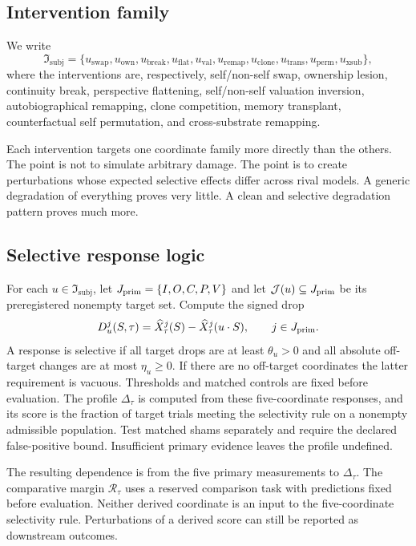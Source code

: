 \documentclass[11pt,a4paper]{article}
\theoremstyle{definition}
\newcommand{\IntervFam}{\mathfrak{I}_{\mathrm{subj}}}
\newcommand{\SelfIndex}{I}
\newcommand{\OwnField}{O}
\newcommand{\ContField}{C}
\newcommand{\Persp}{P}
\newcommand{\ValAsym}{V}
\newcommand{\IntervProf}{\Delta}
\newcommand{\Irred}{\mathcal{R}}
\begin{document}
\subsection{Intervention family}
We write
\[
\IntervFam=\{u_{\mathrm{swap}},u_{\mathrm{own}},u_{\mathrm{break}},u_{\mathrm{flat}},u_{\mathrm{val}},u_{\mathrm{remap}},u_{\mathrm{clone}},u_{\mathrm{trans}},u_{\mathrm{perm}},u_{\mathrm{xsub}}\},
\]
where the interventions are, respectively, self/non-self swap, ownership lesion, continuity break, perspective flattening, self/non-self valuation inversion, auto\-bio\-graphical remapping, clone competition, memory transplant, counterfactual self permutation, and cross-substrate remapping.

Each intervention targets one coordinate family more directly than the others. The point is not to simulate arbitrary damage. The point is to create perturbations whose expected selective effects differ across rival models. A generic degradation of everything proves very little. A clean and selective degradation pattern proves much more.

\subsection{Selective response logic}
For each $u\in\IntervFam$, let $J_{\rm prim}=\{\SelfIndex,\OwnField,\ContField,\Persp,\ValAsym\}$ and let $\mathcal J(u)\subseteq J_{\rm prim}$ be its preregistered nonempty target set. Compute the signed drop
\[
 D_u^j(S,\tau)=\widehat X_\tau^j(S)-\widehat X_\tau^j(u\cdot S),
 \qquad j\in J_{\rm prim}.
\]
A response is selective if all target drops are at least $\theta_u>0$ and all absolute off-target changes are at most $\eta_u\ge0$. If there are no off-target coordinates the latter requirement is vacuous. Thresholds and matched controls are fixed before evaluation. The profile $\IntervProf_\tau$ is computed from these five-coordinate responses, and its score is the fraction of target trials meeting the selectivity rule on a nonempty admissible population. Test matched shams separately and require the declared false-positive bound. Insufficient primary evidence leaves the profile undefined.

The resulting dependence is from the five primary measurements to $\IntervProf_\tau$. The comparative margin $\Irred_\tau$ uses a reserved comparison task with predictions fixed before evaluation. Neither derived coordinate is an input to the five-coordinate selectivity rule. Perturbations of a derived score can still be reported as downstream outcomes.
\end{document}
